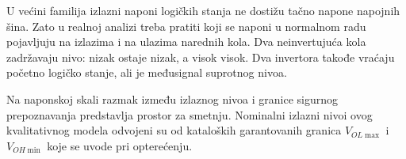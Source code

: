 U većini familija izlazni naponi logičkih stanja ne dostižu tačno napone napojnih šina. Zato u realnoj analizi treba pratiti koji se naponi u normalnom radu pojavljuju na izlazima i na ulazima narednih kola. Dva neinvertujuća kola zadržavaju nivo: nizak ostaje nizak, a visok visok. Dva invertora takođe vraćaju početno logičko stanje, ali je međusignal suprotnog nivoa.

Na naponskoj skali razmak između izlaznog nivoa i granice sigurnog prepoznavanja predstavlja prostor za smetnju. Nominalni izlazni nivoi ovog kvalitativnog modela odvojeni su od kataloških garantovanih granica $V_{OL\max}$ i $V_{OH\min}$ koje se uvode pri opterećenju.
